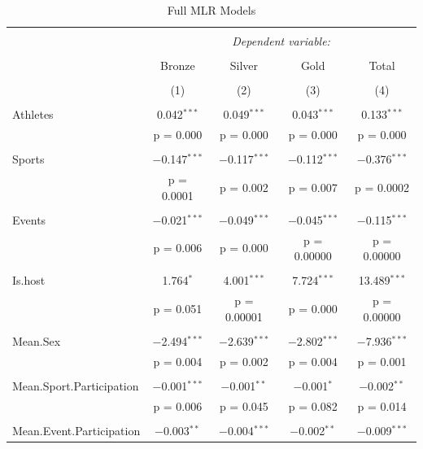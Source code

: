 \documentclass{mcmthesis}
\begin{document}
\begin{longtable}{@{\extracolsep{5pt}}lcccc} 
\caption{Full MLR Models}\label{tbl:full}
\\[-1.8ex]\hline 
\hline \\[-1.8ex] 
 & \multicolumn{4}{c}{\textit{Dependent variable:}} \\ 
\cline{2-5} 
\\[-1.8ex] & Bronze & Silver & Gold & Total \\ 
\\[-1.8ex] & (1) & (2) & (3) & (4)\\ 
\hline \\[-1.8ex] 
 Athletes & 0.042$^{***}$ & 0.049$^{***}$ & 0.043$^{***}$ & 0.133$^{***}$ \\ 
  & p = 0.000 & p = 0.000 & p = 0.000 & p = 0.000 \\ 
  & & & & \\ 
 Sports & $-$0.147$^{***}$ & $-$0.117$^{***}$ & $-$0.112$^{***}$ & $-$0.376$^{***}$ \\ 
  & p = 0.0001 & p = 0.002 & p = 0.007 & p = 0.0002 \\ 
  & & & & \\ 
 Events & $-$0.021$^{***}$ & $-$0.049$^{***}$ & $-$0.045$^{***}$ & $-$0.115$^{***}$ \\ 
  & p = 0.006 & p = 0.000 & p = 0.00000 & p = 0.00000 \\ 
  & & & & \\ 
 Is.host & 1.764$^{*}$ & 4.001$^{***}$ & 7.724$^{***}$ & 13.489$^{***}$ \\ 
  & p = 0.051 & p = 0.00001 & p = 0.000 & p = 0.00000 \\ 
  & & & & \\ 
 Mean.Sex & $-$2.494$^{***}$ & $-$2.639$^{***}$ & $-$2.802$^{***}$ & $-$7.936$^{***}$ \\ 
  & p = 0.004 & p = 0.002 & p = 0.004 & p = 0.001 \\ 
  & & & & \\ 
 Mean.Sport.Participation & $-$0.001$^{***}$ & $-$0.001$^{**}$ & $-$0.001$^{*}$ & $-$0.002$^{**}$ \\ 
  & p = 0.006 & p = 0.045 & p = 0.082 & p = 0.014 \\ 
  & & & & \\ 
 Mean.Event.Participation & $-$0.003$^{**}$ & $-$0.004$^{***}$ & $-$0.002$^{**}$ & $-$0.009$^{***}$ \\ 

\end{longtable}
\end{document}
